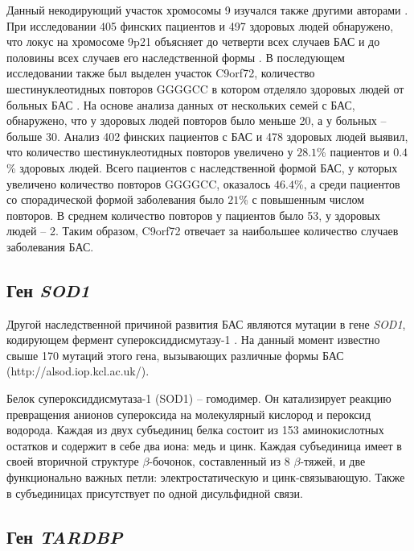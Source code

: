 Данный некодирующий участок хромосомы 9 изучался также другими авторами \cite{Renton2011}. При исследовании 405 финских пациентов и 497 здоровых людей обнаружено, что локус на хромосоме 9p21 объясняет до четверти всех случаев БАС и до половины всех случаев его наследственной формы \cite{Laaksovirta2010}. В последующем исследовании также был выделен участок C9orf72, количество шестинуклеотидных повторов GGGGCC в котором отделяло здоровых людей от больных БАС \cite{Renton2011}. На основе анализа данных от нескольких семей с БАС, обнаружено, что у здоровых людей повторов было меньше 20, а у больных -- больше 30. Анализ 402 финских пациентов с БАС и 478 здоровых людей выявил, что количество шестинуклеотидных повторов увеличено у $28.1$\% пациентов и $0.4$\% здоровых людей. Всего пациентов с наследственной формой БАС, у которых увеличено количество повторов  GGGGCC, оказалось $46.4$\%, а среди пациентов со спорадической формой заболевания было $21$\% с повышенным числом повторов. В среднем количество повторов у пациентов было 53, у здоровых людей -- 2. Таким образом, C9orf72 отвечает за наибольшее количество случаев заболевания БАС. 

\subsection{Ген \textit{SOD1}} \label{subsect_SOD1}

Другой наследственной причиной развития БАС являются мутации в гене \textit{SOD1}, кодирующем фермент супероксиддисмутазу-1 \cite{Bosco2010,Ivanova2014}. На данный момент известно свыше 170 мутаций этого гена, вызывающих различные формы БАС (http://alsod.iop.kcl.ac.uk/). 

Белок супероксиддисмутаза-1 (SOD1) -- гомодимер. Он катализирует реакцию превращения анионов супероксида на молекулярный кислород и пероксид водорода. Каждая из двух субъединиц белка состоит из 153 аминокислотных остатков и содержит в себе два иона: медь и цинк. Каждая субъединица имеет в своей вторичной структуре $\beta$-бочонок, составленный из 8 $\beta$-тяжей, и две функционально важных петли: электростатическую и цинк-связывающую. Также в субъединицах присутствует по одной дисульфидной связи.


\subsection{Ген \textit{TARDBP}} \label{subsect_TARDBP}

